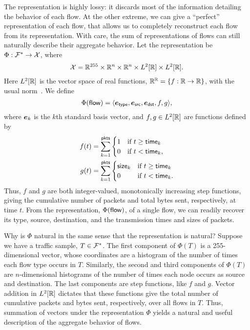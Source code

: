 \documentclass[twocolumn,final]{svjour3}
\begin{document}
The  representation is highly lossy: it discards most of the information detailing the behavior of each flow.
At the other extreme, we can give a ``perfect'' representation of each flow, that allows us to completely reconstruct each flow from its representation.
With care, the sum of representations of flows can still naturally describe their aggregate behavior.
Let the representation be $\Phi: \mathcal{F}^* \to \mathcal{X}$, where
\begin{align}
\mathcal{X} = \mathbb{R}^{255} \times \mathbb{R}^n \times \mathbb{R}^n \times L^2[\mathbb{R}] \times L^2[\mathbb{R}].
\end{align}
Here $L^2[\mathbb{R}]$ is the vector space of real functions, $\mathbb{R}^{\mathbb{R}}={\left\{f: \mathbb{R} \to \mathbb{R}\right\}}$, with the usual norm~\cite{Rudin87}.
We define
\begin{align}
\Phi(\flow) = \tuple{\e_\type,\e_\src,\e_\dst,f,g},
\end{align}
where $\e_k$ is the $k$th standard basis vector, and $f,g \in L^2[\mathbb{R}]$ are functions defined by
\begin{align}
f(t) &= \sum_{k=1}^{\text{\textsf{pkts}}}
  \begin{cases}
    1 & \text{if $t \ge \text{\textsf{time}}_k$} \\
    0 & \text{if $t <   \text{\textsf{time}}_k$},
  \end{cases} \\
g(t) &= \sum_{k=1}^{\text{\textsf{pkts}}}
  \begin{cases}
    \text{\textsf{size}}_k & \text{if $t \ge \text{\textsf{time}}_k$} \\
    0       & \text{if $t <   \text{\textsf{time}}_k$}.
  \end{cases}
\end{align}
Thus, $f$ and $g$ are both integer-valued, monotonically increasing step functions, giving the cumulative number of packets and total bytes sent, respectively, at time $t$.
From the representation, $\Phi(\text{\textsf{flow}})$, of a single flow, we can readily recover its type, source, destination, and the transmission times and sizes of packets.

Why is $\Phi$ natural in the same sense that the  representation is natural?
Suppose we have a traffic sample, $T\in\mathcal{F}^*$.
The first component of $\Phi(T)$ is a 255-dimensional vector, whose coordinates are a histogram of the number of times each flow type occurs in $T$.
Similarly, the second and third components of $\Phi(T)$ are $n$-dimensional histograms of the number of times each node occurs as source and destination.
The last components are step functions, like $f$ and $g$.
Vector addition in $L^2[\mathbb{R}]$ dictates that these functions give the total number of cumulative packets and bytes sent, respectively, over all flows in $T$.
Thus, summation of vectors under the representation $\Phi$ yields a natural and useful description of the aggregate behavior of flows.
\end{document}
